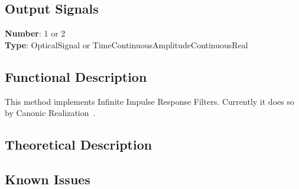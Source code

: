 \begin{refsection}
\subsection*{Output Signals}

\textbf{Number}: 1 or 2\\
\textbf{Type}: OpticalSignal or TimeContinuousAmplitudeContinuousReal

\subsection*{Functional Description}
This method implements Infinite Impulse Response Filters. Currently it does so by Canonic Realization~\cite{jeruchim06}.

\subsection*{Theoretical Description}

\subsection*{Known Issues}



\clearpage
\printbibliography[heading=subbibliography]
\end{refsection}
\cleardoublepage
